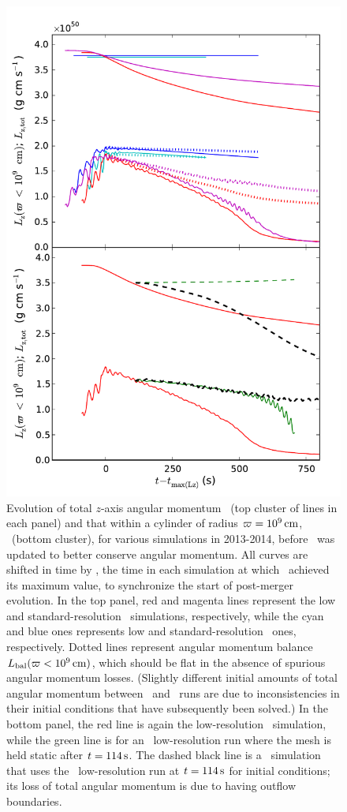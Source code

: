\begin{figure}
\centering
\includegraphics[angle=0,width=0.6\columnwidth]{chapter3_zhu+u/figures/lz_development.pdf}
\caption{Evolution of total $z$-axis angular momentum \Lztot\ (top cluster of lines in each panel) and that within a cylinder of radius $\varpi = 10^9\,\mathrm{cm}$, \Lzinner\ (bottom cluster), for various simulations in 2013-2014, before \arepo\ was updated to better conserve angular momentum.  All curves are shifted in time by \tlm, the time in each simulation at which \Lzinner\ achieved its maximum value, to synchronize the start of post-merger evolution.  In the top panel, red and magenta lines represent the low and standard-resolution \arepo\ simulations, respectively, while the cyan and blue ones represents low and standard-resolution \gasoline\ ones, respectively.  Dotted lines represent angular momentum balance $\Lbal(\winnercyl)$, which should be flat in the absence of spurious angular momentum losses.  (Slightly different initial amounts of total angular momentum between \arepo\ and \gasoline\ runs are due to inconsistencies in their initial conditions that have subsequently been solved.)  In the bottom panel, the red line is again the low-resolution \arepo\ simulation, while the green line is for an \arepo\ low-resolution run where the mesh is held static after $t = 114\,\mathrm{s}$.  The dashed black line is a \flash\ simulation that uses the \arepo\ low-resolution run at $t = 114\,\mathrm{s}$ for initial conditions; its loss of total angular momentum is due to having outflow boundaries.}
\label{fig:c3_fix_angmo}
\end{figure}

